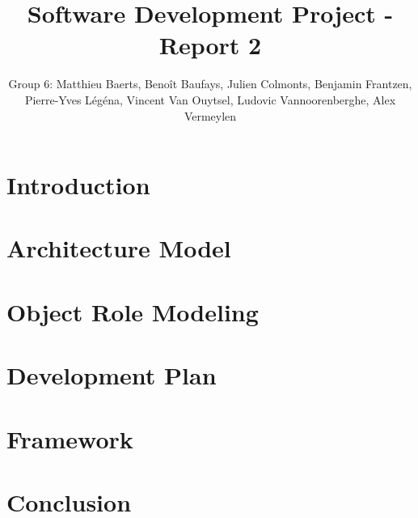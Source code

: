 \documentclass[11pt,a4paper]{article}
\title{Software Development Project - Report 2}
\author{Group 6: Matthieu Baerts, Benoît Baufays, Julien Colmonts, Benjamin Frantzen, Pierre-Yves Légéna, Vincent Van Ouytsel, Ludovic Vannoorenberghe, Alex Vermeylen}
\begin{document}


\tableofcontents
\newpage

\section*{Introduction}


\newpage

\section{Architecture Model}

\newpage

\section{Object Role Modeling}

\newpage

\section{Development Plan}

\newpage

\section{Framework}

\newpage
%

\newpage
\section*{Conclusion}



\newpage

\appendix
{}

\end{document}
